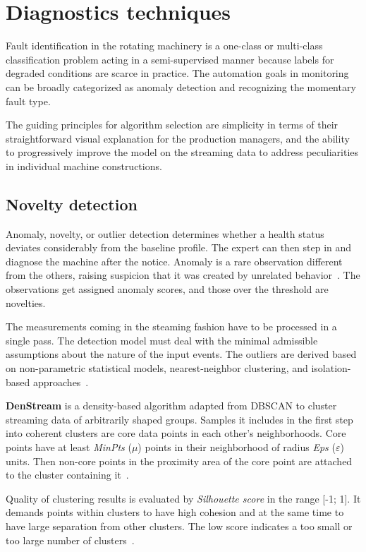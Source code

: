 \section{Diagnostics techniques} \label{section:diagnostics-techniques}
Fault identification in the rotating machinery is a one-class or multi-class classification problem acting in a semi-supervised manner because labels for degraded conditions are scarce in practice. The automation goals in monitoring can be broadly categorized as anomaly detection and recognizing the momentary fault type.

The guiding principles for algorithm selection are simplicity in terms of their straightforward visual explanation for the production managers, and the ability to progressively improve the model on the streaming data to address peculiarities in individual machine constructions.

\subsection{Novelty detection}
Anomaly, novelty, or outlier detection determines whether a health status deviates considerably from the baseline profile. The expert can then step in and diagnose the machine after the notice. Anomaly is a rare observation different from the others, raising suspicion that it was created by unrelated behavior~\cite{aggarwal_outlier_2016}. The observations get assigned anomaly scores, and those over the threshold are novelties.

The measurements coming in the steaming fashion have to be processed in a single pass. The detection model must deal with the minimal admissible assumptions about the nature of the input events. The outliers are derived based on non-parametric statistical models, nearest-neighbor clustering, and isolation-based approaches~\cite{gervasi_anomaly_2020}.
\bigbreak

\textbf{DenStream} is a density-based algorithm adapted from DBSCAN to cluster streaming data of arbitrarily shaped groups. Samples it includes in the first step into coherent clusters are core data points in each other's neighborhoods. Core points have at least \emph{MinPts} ($\mu$) points in their neighborhood of radius \emph{Eps} ($\varepsilon$) units. Then non-core points in the proximity area of the core point are attached to the cluster containing it~\cite{aggarwal_data_2014}.

Quality of clustering results is evaluated by \emph{Silhouette score} in the range [-1; 1]. It demands points within clusters to have high cohesion and at the same time to have large separation from other clusters. The low score indicates a too small or too large number of clusters~\cite{rousseeuw_rousseeuw_1987}. 

